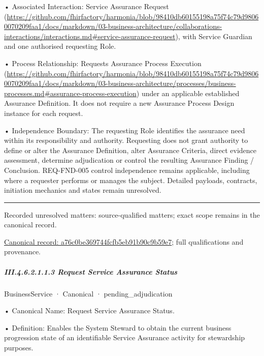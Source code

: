 •
Associated Interaction: Service Assurance Request (\url{https://github.com/fhirfactory/harmonia/blob/98410db60155198a75f74c79d98060070209faa1/docs/markdown/03-business-architecture/collaborations-interactions/interactions.md#service-assurance-request}), with Service Guardian and one authorised requesting Role.



•
Process Relationship: Requests Assurance Process Execution (\url{https://github.com/fhirfactory/harmonia/blob/98410db60155198a75f74c79d98060070209faa1/docs/markdown/03-business-architecture/processes/business-processes.md#assurance-process-execution}) under an applicable established Assurance Definition. It does not require a new Assurance Process Design instance for each request.



•
Independence Boundary: The requesting Role identifies the assurance need within its responsibility and authority. Requesting does not grant authority to define or alter the Assurance Definition, alter Assurance Criteria, direct evidence assessment, determine adjudication or control the resulting Assurance Finding / Conclusion. REQ-FND-005 control independence remains applicable, including where a requester performs or manages the subject. Detailed payloads, contracts, initiation mechanics and states remain unresolved.



\medskip\hrule\medskip

{\small Recorded unresolved matters: source-qualified matters; exact scope remains in the canonical record.}\par
{\footnotesize \href{../../../../../../../continuum/business/business-service/a76c0be369744fcfb5eb91b90c9b59e7.md}{Canonical record: a76c0be369744fcfb5eb91b90c9b59e7}; full qualifications and provenance.}\par
\subparagraph*{III.4.6.2.1.1.3 Request Service Assurance Status}
\label{navigation:III.4.6.2.1.1.3}

\label{element:60f8cbc814614f669f31d4e78734c6d6}
{\small BusinessService · Canonical · pending\_adjudication}\par

•
Canonical Name: Request Service Assurance Status.



•
Definition: Enables the System Steward to obtain the current business progression state of an identifiable Service Assurance activity for stewardship purposes.



